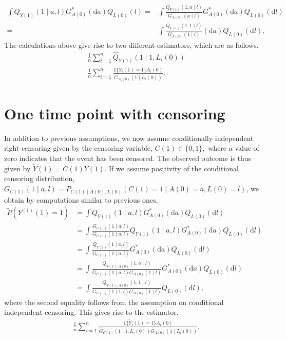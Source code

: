 \documentclass{article}
\newcommand{\A}[1]{A(#1)}
\renewcommand{\L}[1]{L(#1)}
\newcommand{\Y}[1]{Y(#1)}
\newcommand{\C}[1]{C(#1)}
\newcommand{\Ytilde}[1]{\tilde{Y}(#1)}
\newcommand{\Ystar}[2]{Y^{(#1)}(#2)}
\newcommand{\Asubs}[2]{A_{#1}(#2)}
\newcommand{\Lsubs}[2]{L_{#1}(#2)}
\newcommand{\Ysubs}[2]{Y_{#1}(#2)}
\newcommand{\Ytsubs}[2]{\tilde{Y}_{#1}(#2)}
\renewcommand{\d}{\ensuremath{\mathrm{d}}}
\begin{document}
\begin{align*}
    \int Q_{\Y{1}}(1\mid a,l)G^*_{\A{0}}(\d a)Q_{\L{0}}(l)=&\int\frac{Q_{\Y{1}}(1,a\mid l)}{G_{\A{0}}(a\mid l)}G^*_{\A{0}}(\d a)Q_{\L{0}}(\d l)\\
    =&\int\frac{Q_{\Y{1}}(1,1\mid l)}{G_{\A{0}}(1\mid l)}(\d a)Q_{\L{0}}(\d l).
\end{align*}
The calculations above give rise to two different estimators, which are as follows.
\begin{align*}
    &\frac{1}{n}\sum_{i=1}^n\hat{Q}_{\Y{1}}(1\mid 1,\Lsubs{i}{0})\tag{G-formula}\\
    &\frac{1}{n}\sum_{i=1}^n\frac{\mathds{1}\{\Ysubs{i}{1}=1\}\Asubs{i}{0}}{\hat{G}_{\Asubs{i}{0}}(1\mid \Lsubs{i}{0})}.\tag{IPTW}
\end{align*}
\section{One time point with censoring}
In addition to previous assumptions, we now assume conditionally independent right-censoring given by the censoring variable, $\C{1}\in\{0,1\},$ where a value of zero indicates that the event has been censored. The observed outcome is thus given by $\Ytilde{1}=\C{1}\Y{1}$. If we assume positivity of the conditional censoring distribution, $G_{\C{1}}(1\mid a,l)=P_{\C{1}\mid \A{0},\L{0}}(\C{1}=1\mid \A{0}=a, \L{0}=l)$, we obtain by computations similar to previous ones,
\begin{align*}
    \tilde{P}(\Ystar{1}{1}=1)&=\int Q_{\Y{1}}(1\mid a,l)G^*_{\A{0}}(\d a)Q_{\L{0}}(\d l)\\
    &=\int\frac{G_{\C{1}}(1\mid a,l)}{G_{\C{1}}(1\mid a,l)}Q_{\Y{1}}(1\mid a,l)G^*_{\A{0}}(\d a)Q_{\L{0}}(\d l)\\
    &=\int\frac{Q_{\Ytilde{1}}(1\mid a,l)}{G_{\C{1}}(1\mid a,l)}G^*_{\A{0}}(\d a)Q_{\L{0}}(\d l)\\
    &=\int\frac{Q_{\Ytilde{1},\A{0}}(1,a\mid l)}{G_{\C{1}}(1\mid a,l)G_{\A{0}}(1\mid l)}G^*_{\A{0}}(\d a)Q_{\L{0}}(\d l)\\
    &=\int\frac{Q_{\Ytilde{1},\A{0}}(1,1\mid l)}{G_{\C{1}}(1\mid 1,l)G_{\A{0}}(1\mid l)}Q_{\L{0}}(\d l),
\end{align*}
where the second equality follows from the assumption on conditional independent censoring. This gives rise to the estimator,
\begin{align*}
    &\frac{1}{n}\sum_{i=1}^n\frac{\mathds{1}\{\Ytsubs{i}{1}=1\}\Asubs{i}{0}}{\hat{G}_{\C{1}}(1\mid 1,\Lsubs{i}{0})\hat{G}_{\A{0}}(1\mid \Lsubs{i}{0})}.\tag{IPCW}
\end{align*}
\end{document}
